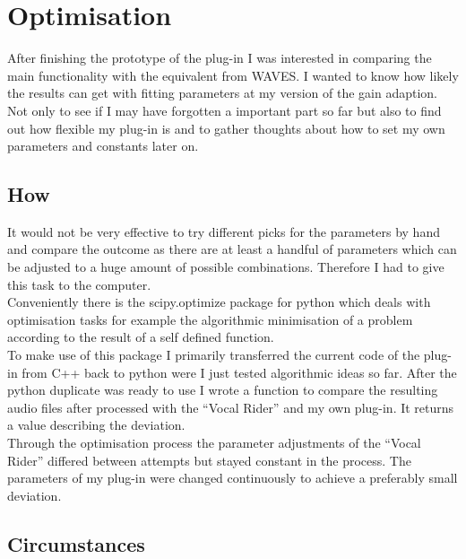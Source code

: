 \chapter{Optimisation}
\label{chapter:optimisation}

After finishing the prototype of the plug-in I was interested in comparing the main functionality with the equivalent from WAVES. I wanted to know how likely the results can get with fitting parameters at my version of the gain adaption. Not only to see if I may have forgotten a important part so far but also to find out how flexible my plug-in is and to gather thoughts about how to set my own parameters and constants later on.\\

\section{How}

It would not be very effective to try different picks for the parameters by hand and compare the outcome as there are at least a handful of parameters which can be adjusted to a huge amount of possible combinations. Therefore I had to give this task to the computer.\\
Conveniently there is the scipy.optimize package for python which deals with optimisation tasks for example the algorithmic minimisation of a problem according to the result of a self defined function.\\
To make use of this package I primarily transferred the current code of the plug-in from C++ back to python were I just tested algorithmic ideas so far. After the python duplicate was ready to use I wrote a function to compare the resulting audio files after processed with the “Vocal Rider” and my own plug-in. It returns a value describing the deviation.\\
Through the optimisation process the parameter adjustments of the “Vocal Rider” differed between attempts but stayed constant in the process. The parameters of my plug-in were changed continuously to achieve a preferably small deviation.\\

\section{Circumstances}

